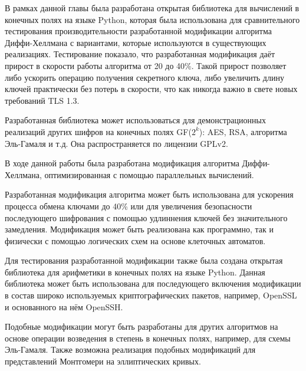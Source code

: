 \documentclass[times,specification,annotation]{itmo-student-thesis}
\begin{document}
\chapterconclusion

В рамках данной главы была разработана открытая библиотека для вычислений в конечных полях на языке Python,
которая была использована для сравнительного тестирования производительности разработанной модификации
алгоритма Диффи-Хеллмана с вариантами, которые используются в существующих реализациях.
Тестирование показало, что разработанная модификация даёт прирост в скорости работы алгоритма от 20 до 40\%.
Такой прирост позволяет либо ускорить операцию получения секретного ключа, либо увеличить длину ключей практически без
потерь в скорости, что как никогда важно в свете новых требований TLS 1.3.

Разработанная библиотека может использоваться для демонстрационных реализаций других шифров на конечных полях GF($2^k$):
AES, RSA, алгоритма Эль-Гамаля и т.д.
Она распространяется по лицензии GPLv2.

\startconclusionpage

В ходе данной работы была разработана модификация алгоритма Диффи-Хеллмана, оптимизированная с помощью параллельных вычислений.

Разработанная модификация алгоритма может быть использована для ускорения процесса обмена ключами до 40\% или для
увеличения безопасности последующего шифрования с помощью удлиннения ключей без значительного замедления.
Модификация может быть реализована как программно, так и физически с помощью логических схем на основе клеточных автоматов.

Для тестирования разработанной модификации также была создана открытая библиотека для арифметики в конечных полях на языке Python.
Данная библиотека может быть использована для последующего включения модификации в состав широко используемых
криптографических пакетов, например, OpenSSL и основанного на нём OpenSSH.

Подобные модификации могут быть разработаны для других алгоритмов на основе операции возведения в степень в конечных полях,
например, для схемы Эль-Гамаля.
Также возможна реализация подобных модификаций для представлений Монтгомери на эллиптических кривых.

\printmainbibliography
\end{document}
